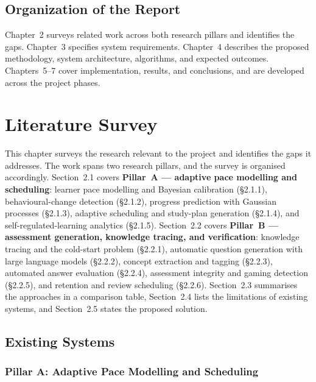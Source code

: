 \documentclass[12pt]{report}
\begin{document}
\section{Organization of the Report}
Chapter~2 surveys related work across both research pillars and identifies the gaps.
Chapter~3 specifies system requirements. Chapter~4 describes the proposed methodology,
system architecture, algorithms, and expected outcomes. Chapters~5--7 cover
implementation, results, and conclusions, and are developed across the project phases.

\newpage

\chapter{Literature Survey}

This chapter surveys the research relevant to the project and identifies the gaps it
addresses. The work spans two research pillars, and the survey is organised accordingly.
Section~2.1 covers \textbf{Pillar~A --- adaptive pace modelling and scheduling}: learner
pace modelling and Bayesian calibration (\S2.1.1), behavioural-change detection
(\S2.1.2), progress prediction with Gaussian processes (\S2.1.3), adaptive scheduling and
study-plan generation (\S2.1.4), and self-regulated-learning analytics (\S2.1.5).
Section~2.2 covers \textbf{Pillar~B --- assessment generation, knowledge tracing, and
verification}: knowledge tracing and the cold-start problem (\S2.2.1), automatic
question generation with large language models (\S2.2.2), concept extraction and tagging
(\S2.2.3), automated answer evaluation (\S2.2.4), assessment integrity and gaming
detection (\S2.2.5), and retention and review scheduling (\S2.2.6). Section~2.3 summarises
the approaches in a comparison table, Section~2.4 lists the limitations of existing
systems, and Section~2.5 states the proposed solution.

\section{Existing Systems}

\subsection{Pillar A: Adaptive Pace Modelling and Scheduling}
\end{document}
